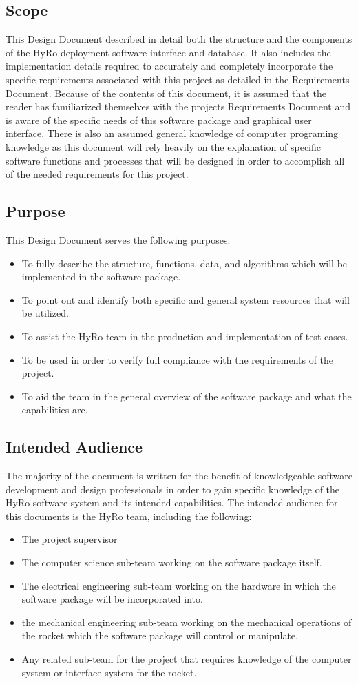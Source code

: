 \documentclass[10pt,draftclsnofoot,onecolumn,compsoc]{IEEEtran}
\begin{document}
\subsection{Scope}
This Design Document described in detail both the structure and the components of the HyRo deployment software interface and database. It also includes the implementation details required to accurately and completely incorporate the specific requirements associated with this project as detailed in the Requirements Document. Because of the contents of this document, it is assumed that the reader has familiarized themselves with the projects Requirements Document and is aware of the specific needs of this software package and graphical user interface. There is also an assumed general knowledge of computer programing knowledge as this document will rely heavily on the explanation of specific software functions and processes that will be designed in order to accomplish all of the needed requirements for this project. 
\subsection{Purpose}
This Design Document serves the following purposes:
\begin{itemize}
	\item To fully describe the structure, functions, data, and algorithms which will be implemented in the software package.
	\item To point out and identify both specific and general system resources that will be utilized.
	\item To assist the HyRo team in the production and implementation of test cases.
	\item To be used in order to verify full compliance with the requirements of the project.
	\item To aid the team in the general overview of the software package and what the capabilities are.
\end{itemize}
\subsection{Intended Audience}
The majority of the document is written for the benefit of knowledgeable software development and design professionals in order to gain specific knowledge of the HyRo software system and its intended capabilities. The intended audience for this documents is the HyRo team, including the following:
\begin{itemize}
	\item The project supervisor 
	\item The computer science sub-team working on the software package itself.
	\item The electrical engineering sub-team working on the hardware in which the software package will be incorporated into.
	\item the mechanical engineering sub-team working on the mechanical operations of the rocket which the software package will control or manipulate.
	\item Any related sub-team for the project that requires knowledge of the computer system or interface system for the rocket.
\end{itemize}
\end{document}

